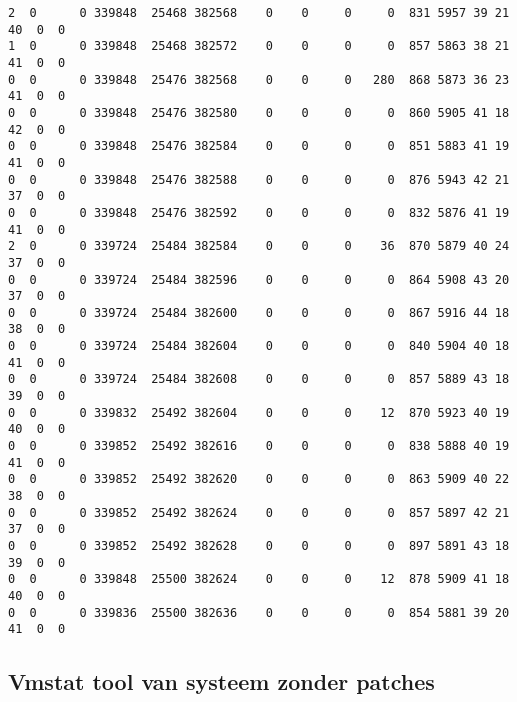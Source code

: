 \begin{lstlisting}[caption={Eerste 50 resultaten}, basicstyle=\footnotesize]
2  0      0 339848  25468 382568    0    0     0     0  831 5957 39 21 40  0  0
1  0      0 339848  25468 382572    0    0     0     0  857 5863 38 21 41  0  0
0  0      0 339848  25476 382568    0    0     0   280  868 5873 36 23 41  0  0
0  0      0 339848  25476 382580    0    0     0     0  860 5905 41 18 42  0  0
0  0      0 339848  25476 382584    0    0     0     0  851 5883 41 19 41  0  0
0  0      0 339848  25476 382588    0    0     0     0  876 5943 42 21 37  0  0
0  0      0 339848  25476 382592    0    0     0     0  832 5876 41 19 41  0  0
2  0      0 339724  25484 382584    0    0     0    36  870 5879 40 24 37  0  0
0  0      0 339724  25484 382596    0    0     0     0  864 5908 43 20 37  0  0
0  0      0 339724  25484 382600    0    0     0     0  867 5916 44 18 38  0  0
0  0      0 339724  25484 382604    0    0     0     0  840 5904 40 18 41  0  0
0  0      0 339724  25484 382608    0    0     0     0  857 5889 43 18 39  0  0
0  0      0 339832  25492 382604    0    0     0    12  870 5923 40 19 40  0  0
0  0      0 339852  25492 382616    0    0     0     0  838 5888 40 19 41  0  0
0  0      0 339852  25492 382620    0    0     0     0  863 5909 40 22 38  0  0
0  0      0 339852  25492 382624    0    0     0     0  857 5897 42 21 37  0  0
0  0      0 339852  25492 382628    0    0     0     0  897 5891 43 18 39  0  0
0  0      0 339848  25500 382624    0    0     0    12  878 5909 41 18 40  0  0
0  0      0 339836  25500 382636    0    0     0     0  854 5881 39 20 41  0  0

\end{lstlisting}

\newpage

\subsection{Vmstat tool van systeem zonder patches}

